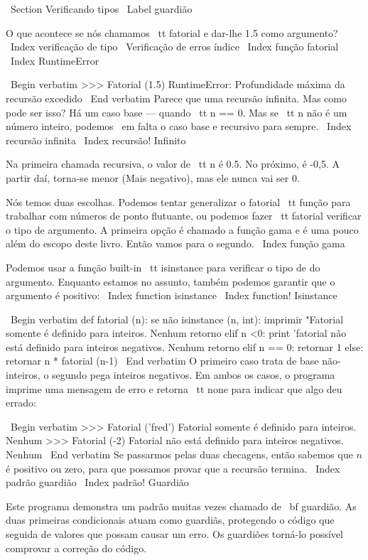 \documentclass[10pt]{book}
\begin{document}
\begin {itemize}
{{{{\ Section {Verificando tipos}
\ Label {guardião}

O que acontece se nós chamamos {\ tt fatorial} e dar-lhe 1.5 como argumento?
\ Index {verificação de tipo}
\ {Verificação de erros} índice
\ Index {função fatorial}
\ Index {} RuntimeError

\ Begin {verbatim}
>>> Fatorial (1.5)
RuntimeError: Profundidade máxima da recursão excedido
\ End {verbatim}
%
Parece que uma recursão infinita. Mas como pode ser isso? Há um
caso base --- quando {\ tt n == 0}. Mas se {\ tt n} não é um número inteiro,
podemos {\ em falta} o caso base e recursivo para sempre.
\ Index {recursão infinita}
\ Index {recursão! Infinito}

Na primeira chamada recursiva, o valor de {\ tt n} é 0.5.
No próximo, é -0,5. A partir daí, torna-se menor
(Mais negativo), mas ele nunca vai ser 0.

Nós temos duas escolhas. Podemos tentar generalizar o fatorial {\ tt}
função para trabalhar com números de ponto flutuante, ou podemos fazer {\ tt
  fatorial} verificar o tipo de argumento. A primeira opção é
chamado a função gama e é uma
pouco além do escopo deste livro. Então vamos para o segundo.
\ Index {função gama}

Podemos usar a função built-in {\ tt isinstance} para verificar o tipo de
do argumento. Enquanto estamos no assunto, também podemos garantir que o
argumento é positivo:
\ Index {function isinstance}
\ Index {function! Isinstance}

\ Begin {verbatim}
def fatorial (n):
    se não isinstance (n, int):
        imprimir "Fatorial somente é definido para inteiros.
        Nenhum retorno
    elif n <0:
        print 'fatorial não está definido para inteiros negativos.
        Nenhum retorno
    elif n == 0:
        retornar 1
    else:
        retornar n * fatorial (n-1)
\ End {verbatim}
%
O primeiro caso trata de base não-inteiros, o
segundo pega inteiros negativos. Em ambos os casos, o programa imprime
uma mensagem de erro e retorna {\ tt none} para indicar que algo
deu errado:

\ Begin {verbatim}
>>> Fatorial ('fred')
Fatorial somente é definido para inteiros.
Nenhum
>>> Fatorial (-2)
Fatorial não está definido para inteiros negativos.
Nenhum
\ End {verbatim}
% 
Se passarmos pelas duas checagens, então sabemos que $ n $ é positivo ou
zero, para que possamos provar que a recursão termina.
\ Index {padrão guardião}
\ Index {padrão! Guardião}

Este programa demonstra um padrão muitas vezes chamado de {\ bf guardião}.
As duas primeiras condicionais atuam como guardiãs, protegendo o código que
seguida de valores que possam causar um erro. Os guardiões torná-lo
possível comprovar a correção do código.

}}}}
\end{itemize}
\end{document}
